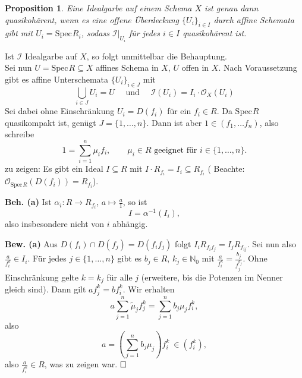 \documentclass[11pt]{book}
\newtheorem{proposition}[theorem]{Proposition}
\theoremstyle{nonumberbreak}
\newenvironment{pr}[1][]{\ifthenelse{\equal{#1}{}}{\proof}{\proof[#1]}\rm}{\endproof}
\newcommand{\spec}{\mathrm{Spec} \hspace{1pt} }
\newcommand{\ideal}{\subseteq}
\begin{document}
\begin{spacing}{1.4}
\begin{proposition}    %
Eine Idealgarbe auf einem Schema $X$ ist genau dann quasikohärent, wenn es eine offene Überdeckung $\{U_i\}_{i \in I}$ durch affine Schemata gibt mit $U_i = \spec R_i$, sodass $\mathcal{I}\vert_{U_i}$ für jedes $i \in I$ quasikohärent ist.
\end{proposition}

\begin{pr}
Ist $\mathcal{I}$ Idealgarbe auf $X$, so folgt unmittelbar die Behauptung. \\
Sei nun $U = \spec R \subseteq X$ affines Schema in $X$, $U$ offen in $X$. Nach Voraussetzung gibt es affine Unterschemata $\{U_i\}_{i \in J}$ mit 
$$\bigcup_{i \in J} U_i = U \quad \textrm{ und } \quad \mathcal{I}(U_i) = I_i \cdot \mathcal{O}_X(U_i)$$
Sei dabei ohne Einschränkung $U_i = D(f_i)$ für ein $f_i \in R$. Da $\spec R$ quasikompakt ist, genügt $J= \{1, \ldots, n \}$. Dann ist aber $1 \in ( f_1, \ldots f_n )$, also schreibe
$$1 = \sum_{i=1}^n \mu_i f_i, \qquad \mu_i \in R \textrm{ geeignet für } i \in \{1, \ldots, n \}.$$
zu zeigen: Es gibt ein Ideal $I \ideal R$ mit $I \cdot R_{f_i} = I_i \ideal R_{f_i}$ ( Beachte: $\mathcal{O}_{\spec R} \left( D(f_i)\right) = R_{f_i}$).
\begin{compactenum}
\item[\textbf{Beh. (a)}] Ist $\alpha_i: R \longrightarrow R_{f_i}$, $a \mapsto \frac{a}{1}$, so ist 
$$I= \alpha^{-1}(I_i),$$
also insbesondere nicht von $i$ abhängig.
\item[\textbf{Bew. (a)}] Aus $D(f_i) \cap D(f_j) = D(f_i f_j)$ folgt  $I_i R_{f_if_j} = I_j R_{f_{ij}}$. Sei nun also $\frac{a}{f_i^k} \in I_i$. Für jedes $j \in \{1, \ldots, n \}$ gibt es $b_j \in R$, $k_j \in \mathbb{N}_0$ mit  $\frac{a}{f_i^k} = \frac{b_j}{f_j^{k_j}}$. Ohne Einschränkung gelte $k=k_j$ für alle $j$ (erweitere, bis die Potenzen im Nenner gleich sind). Dann gilt $a f_j^k = b f_i^k$. Wir erhalten
$$a \sum_{j=1}^n \tilde{\mu}_j f_j^k = \sum_{j=1}^n b_j \mu_j f_i^k,$$
also
$$a = \left( \sum_{j=1}^n b_j \mu_j \right) f_i^k \ \in ( f_i^k ), $$
also $\frac{a}{f_i^k} \in R$, was zu zeigen war. $\hfill \Box$

\end{compactenum}

\end{pr}

\newcommand{\OO}{\mathcal{O}}


\end{spacing}
\end{document}
